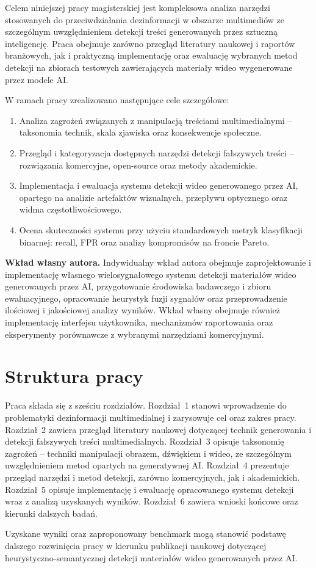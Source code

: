 Celem niniejszej pracy magisterskiej jest kompleksowa analiza narzędzi stosowanych do przeciwdziałania dezinformacji w obszarze multimediów ze szczególnym uwzględnieniem detekcji treści generowanych przez sztuczną inteligencję.
Praca obejmuje zarówno przegląd literatury naukowej i raportów branżowych, jak i praktyczną implementację oraz ewaluację wybranych metod detekcji na zbiorach testowych zawierających materiały wideo wygenerowane przez modele AI.

W ramach pracy zrealizowano następujące cele szczegółowe:
\begin{enumerate}
    \item Analiza zagrożeń związanych z manipulacją treściami multimedialnymi -- taksonomia technik, skala zjawiska oraz konsekwencje społeczne.
    \item Przegląd i kategoryzacja dostępnych narzędzi detekcji fałszywych treści -- rozwiązania komercyjne, open-source oraz metody akademickie.
    \item Implementacja i ewaluacja systemu detekcji wideo generowanego przez AI, opartego na analizie artefaktów wizualnych, przepływu optycznego oraz widma częstotliwościowego.
    \item Ocena skuteczności systemu przy użyciu standardowych metryk klasyfikacji binarnej: recall, FPR oraz analizy kompromisów na froncie Pareto.
\end{enumerate}

\noindent\textbf{Wkład własny autora.}
Indywidualny wkład autora obejmuje zaprojektowanie i implementację własnego
wielosygnałowego systemu detekcji materiałów wideo generowanych przez AI,
przygotowanie środowiska badawczego i zbioru ewaluacyjnego, opracowanie
heurystyk fuzji sygnałów oraz przeprowadzenie ilościowej i jakościowej analizy wyników.
Wkład własny obejmuje również implementację interfejsu użytkownika,
mechanizmów raportowania oraz eksperymenty porównawcze z wybranymi narzędziami komercyjnymi.

\section*{Struktura pracy}

Praca składa się z sześciu rozdziałów.
Rozdział~1 stanowi wprowadzenie do problematyki dezinformacji multimedialnej i zarysowuje cel oraz zakres pracy.
Rozdział~2 zawiera przegląd literatury naukowej dotyczącej technik generowania i detekcji fałszywych treści multimedialnych.
Rozdział~3 opisuje taksonomię zagrożeń -- techniki manipulacji obrazem, dźwiękiem i wideo, ze szczególnym uwzględnieniem metod opartych na generatywnej AI.
Rozdział~4 prezentuje przegląd narzędzi i metod detekcji, zarówno komercyjnych, jak i akademickich.
Rozdział~5 opisuje implementację i ewaluację opracowanego systemu detekcji wraz z analizą uzyskanych wyników.
Rozdział~6 zawiera wnioski końcowe oraz kierunki dalszych badań.

Uzyskane wyniki oraz zaproponowany benchmark mogą stanowić podstawę dalszego rozwinięcia pracy w kierunku publikacji naukowej dotyczącej heurystyczno-semantycznej detekcji materiałów wideo generowanych przez AI.
